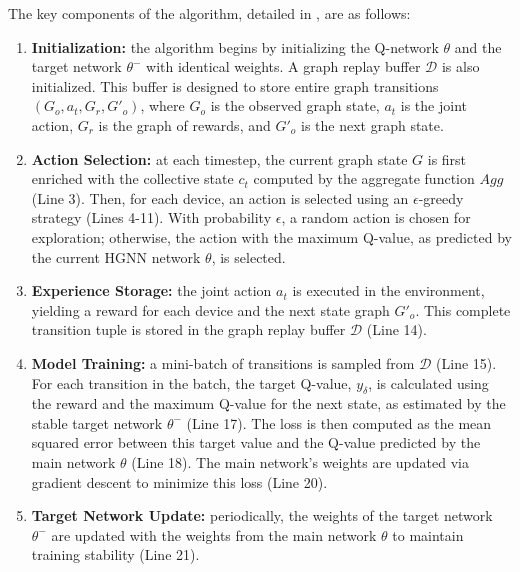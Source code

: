 The key components of the algorithm, detailed in , are as follows:
\begin{enumerate}
    \item \textbf{Initialization:} the algorithm begins by initializing the Q-network $\theta$ and the target network $\theta^-$ with identical weights. 
    A graph replay buffer $\mathcal{D}$ is also initialized. 
    This buffer is designed to store entire graph transitions $(G_o, a_t, G_r, G'_o)$, 
    where $G_o$ is the observed graph state, 
    $a_t$ is the joint action, $G_r$ is the graph of rewards, 
    and $G'_o$ is the next graph state.
    \item \textbf{Action Selection:} at each timestep, 
    the current graph state $G$ is first enriched with the collective state $c_t$ computed by the aggregate function $Agg$ (Line 3). 
    Then, for each device, an action is selected using an $\epsilon$-greedy strategy (Lines 4-11). 
    With probability $\epsilon$, a random action is chosen for exploration; 
    otherwise, the action with the maximum Q-value, as predicted by the current \gls{HGNN} network $\theta$, is selected.
    \item \textbf{Experience Storage:} the joint action $a_t$ is executed in the environment, 
    yielding a reward for each device and the next state graph $G'_o$. 
    This complete transition tuple is stored in the graph replay buffer $\mathcal{D}$ (Line 14).
    \item \textbf{Model Training:} a mini-batch of transitions is sampled from $\mathcal{D}$ (Line 15). For each transition in the batch, 
    the target Q-value, $y_\delta$, 
    is calculated using the reward and the maximum Q-value for the next state, as estimated by the stable target network $\theta^-$ (Line 17). 
    The loss is then computed as the mean squared error between this target value and the Q-value predicted by the main network $\theta$ (Line 18). 
    The main network's weights are updated via gradient descent to minimize this loss (Line 20).
    \item \textbf{Target Network Update:} periodically, 
    the weights of the target network $\theta^-$ are updated with the weights from the main network $\theta$ to maintain training stability (Line 21).
\end{enumerate}


